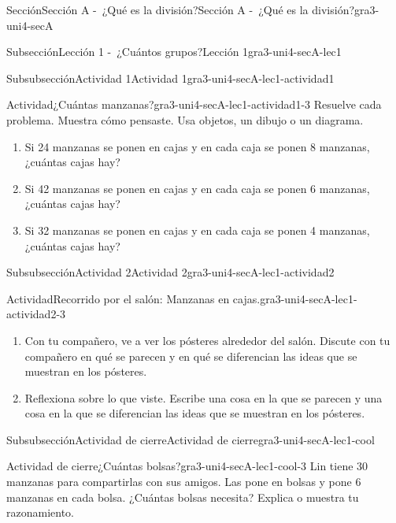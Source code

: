 \documentclass[twoside,10pt,]{article}
\begin{document}
\begin{sectionptx}{Sección}{Sección A -~¿Qué es la división?}{}{Sección A -~¿Qué es la división?}{}{}{gra3-uni4-secA}
\begin{subsectionptx}{Subsección}{Lección 1 -~¿Cuántos grupos?}{}{Lección 1}{}{}{gra3-uni4-secA-lec1}
\begin{subsubsectionptx}{Subsubsección}{Actividad 1}{}{Actividad 1}{}{}{gra3-uni4-secA-lec1-actividad1}
\begin{activity}{Actividad}{¿Cuántas manzanas?}{gra3-uni4-secA-lec1-actividad1-3}%
Resuelve cada problema. Muestra cómo pensaste. Usa objetos, un dibujo o un diagrama.%
\par
%
\begin{enumerate}
\item{}Si 24 manzanas se ponen en cajas y en cada caja se ponen 8 manzanas, ¿cuántas cajas hay?%
\item{}Si 42 manzanas se ponen en cajas y en cada caja se ponen 6 manzanas, ¿cuántas cajas hay?%
\item{}Si 32 manzanas se ponen en cajas y en cada caja se ponen 4 manzanas, ¿cuántas cajas hay?%
\end{enumerate}
%
\end{activity}%
\end{subsubsectionptx}
%
%
\typeout{************************************************}
\typeout{************************************************}
%
\begin{subsubsectionptx}{Subsubsección}{Actividad 2}{}{Actividad 2}{}{}{gra3-uni4-secA-lec1-actividad2}
\begin{activity}{Actividad}{Recorrido por el salón: Manzanas en cajas.}{gra3-uni4-secA-lec1-actividad2-3}%
%
\begin{enumerate}
\item{}Con tu compañero, ve a ver los pósteres alrededor del salón. Discute con tu compañero en qué se parecen y en qué se diferencian las ideas que se muestran en los pósteres.%
\item{}Reflexiona sobre lo que viste. Escribe una cosa en la que se parecen y una cosa en la que se diferencian las ideas que se muestran en los pósteres.%
\end{enumerate}
%
\end{activity}%
\end{subsubsectionptx}
%
%
\typeout{************************************************}
\typeout{************************************************}
%
\begin{subsubsectionptx}{Subsubsección}{Actividad de cierre}{}{Actividad de cierre}{}{}{gra3-uni4-secA-lec1-cool}
\begin{project}{Actividad de cierre}{¿Cuántas bolsas?}{gra3-uni4-secA-lec1-cool-3}%
Lin tiene 30 manzanas para compartirlas con sus amigos. Las pone en bolsas y pone 6 manzanas en cada bolsa. ¿Cuántas bolsas necesita? Explica o muestra tu razonamiento.%

\end{project}
\end{subsubsectionptx}
\end{subsectionptx}
\end{sectionptx}
\end{document}
